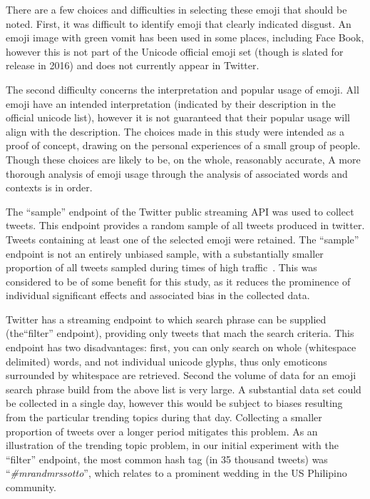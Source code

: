 \documentclass[10pt, a4paper]{article}
\begin{document}
There are a few choices and difficulties in selecting these emoji that should be noted.
First, it was difficult to identify emoji that clearly indicated disgust. 
An emoji image with green vomit has been used in some places, including Face Book, however this is not part of the Unicode official emoji set (though is slated for release in 2016) and does not currently appear in Twitter.

The second difficulty concerns the interpretation and popular usage of emoji. 
All emoji have an intended interpretation (indicated by their description in the official unicode list), however it is not guaranteed that their popular usage will align with the description. 
The choices made in this study were intended as a proof of concept, drawing on the personal experiences of a small group of people. 
Though these choices are likely to be, on the whole, reasonably accurate, 
A more thorough analysis of 
emoji usage through the analysis of associated words and contexts is in order. 

The ``sample'' endpoint of the Twitter public streaming API was used to collect tweets. This endpoint provides a random sample of all tweets produced in twitter.
Tweets containing at least one of the selected emoji were retained. The ``sample'' endpoint is not an entirely unbiased sample, with a substantially smaller proportion of all tweets sampled during times of high traffic~\cite{Morstatter2013Is}. This was considered to be of some benefit for this study, as it reduces the prominence of individual significant effects and associated bias in the collected data.

Twitter has a streaming endpoint to which search phrase can be supplied (the``filter'' endpoint), providing only tweets that mach the search criteria.
This endpoint has two disadvantages: first, you can only search on whole (whitespace delimited) words, and not individual unicode glyphs, thus only emoticons surrounded by whitespace are retrieved. 
Second the volume of data for an emoji search phrase build from the above list is very large. A substantial data set could be collected in a single day, however this would be subject to biases resulting from the particular trending topics during that day. 
Collecting a smaller proportion of tweets over a longer period mitigates this problem.
As an illustration of the trending topic problem, in our initial experiment with the ``filter'' endpoint, the most common hash tag (in 35 thousand tweets) was ``\emph{\#mrandmrssotto}'', which relates to a prominent wedding in the US Philipino community.
\end{document}
